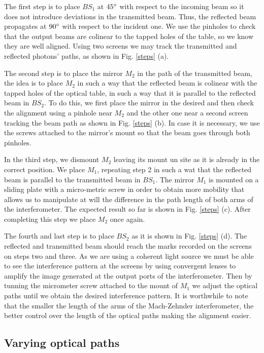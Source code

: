 \documentclass[12pt]{book}
\begin{document}
The first step is to place $BS_{1}$ at $45\degree$ with respect to the incoming beam so it does not introduce deviations in the transmitted beam. Thus, the reflected beam propagates at $90\degree$ with respect to the incident one. We use the pinholes to check that the output beams are colinear to the tapped holes of the table, so we know they are well aligned. Using two screens we may track the transmitted and reflected photons' paths, as shown in Fig. \ref{steps} (a).

The second step is to place the mirror $M_{2}$ in the path of the transmitted beam, the idea is to place $M_{2}$ in such a way that the reflected beam is colinear with the tapped holes of the optical table, in such a way that it is parallel to the reflected beam in $BS_{2}$. To do this, we first place the mirror in the desired and then check the alignment using a pinhole near $M_{2}$ and the other one near a second screen tracking the beam path as shown in Fig. \ref{steps} (b). In case it is necessary, we use the screws attached to the mirror's mount so that the beam goes through both pinholes.

In the third step, we dismount $M_{2}$ leaving its mount un site as it is already in the correct position. We place $M_{1}$, repeating step 2 in such a wat that the reflected beam is parallel to the transmitted beam in $BS_{1}$. The mirror $M_{1}$ is mounted on a sliding plate with a micro-metric screw in order to obtain more mobility that allows us to manipulate at will the difference in the path length of both arms of the interferometer. The expected result so far is shown in Fig. \ref{steps} (c). After completing this step we place $M_{2}$ once again.

The fourth and last step is to place $BS_{2}$ as it is shown in Fig. \ref{steps} (d). The reflected and transmitted beam should reach the marks recorded on the screens on steps two and three. As we are using a coherent light source we must be able to see the interference pattern at the screens by using convergent lenses to amplify the image generated at the output ports of the interferometer. Then by tunning the micrometer screw attached to the mount of $M_{1}$  we adjust the optical paths until we obtain the desired interference pattern. It is worthwhile to note that the smaller the length of the arms of the Mach-Zehnder interferometer, the better control over the length of the optical paths making the alignment easier.


\subsection{Varying optical paths}
\end{document}
